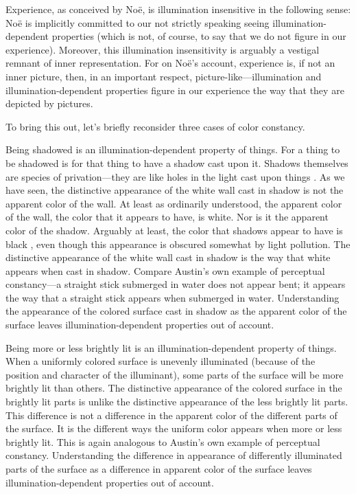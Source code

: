 \documentclass[12pt]{article}
\begin{document}
Experience, as conceived by Noë, is illumination insensitive in the following sense: Noë is implicitly committed to our not strictly speaking seeing illumina\-tion-dependent properties (which is not, of course, to say that we do not figure in our experience). Moreover, this illumination insensitivity is arguably a vestigal remnant of inner representation. For on Noë's account, experience is, if not an inner picture, then, in an important respect, picture-like---illumination and illumination-dependent properties figure in our experience the way that they are depicted by pictures. 

To bring this out, let's briefly reconsider three cases of color constancy.

Being shadowed is an illumination-dependent property of things. For a thing to be shadowed is for that thing to have a shadow cast upon it. Shadows themselves are species of privation---they are like holes in the light cast upon things \citep[see][]{Sorensen:2008kx}. As we have seen, the distinctive appearance of the white wall cast in shadow is not the apparent color of the wall. At least as ordinarily understood, the apparent color of the wall, the color that it appears to have, is white. Nor is it the apparent color of the shadow. Arguably at least, the color that shadows appear to have is black \citep{Sorensen:2008kx}, even though this appearance is obscured somewhat by light pollution. The distinctive appearance of the white wall cast in shadow is the way that white appears when cast in shadow. Compare Austin's \citeyearpar{Austin:1962lr} own example of perceptual constancy---a straight stick submerged in water does not appear bent; it appears the way that a straight stick appears when submerged in water. Understanding the appearance of the colored surface cast in shadow as the apparent color of the surface leaves illumination-dependent properties out of account.

Being more or less brightly lit is an illumination-dependent property of things. When a uniformly colored surface is unevenly illuminated (because of the position and character of the illuminant), some parts of the surface will be more brightly lit than others. The distinctive appearance of the colored surface in the brightly lit parts is unlike the distinctive appearance of the less brightly lit parts. This difference is not a difference in the apparent color of the different parts of the surface. It is the different ways the uniform color appears when more or less brightly lit. This is again analogous to Austin's own example of perceptual constancy. Understanding the difference in appearance of differently illuminated parts of the surface as a difference in apparent color of the surface leaves illumination-dependent properties out of account.
\end{document}
